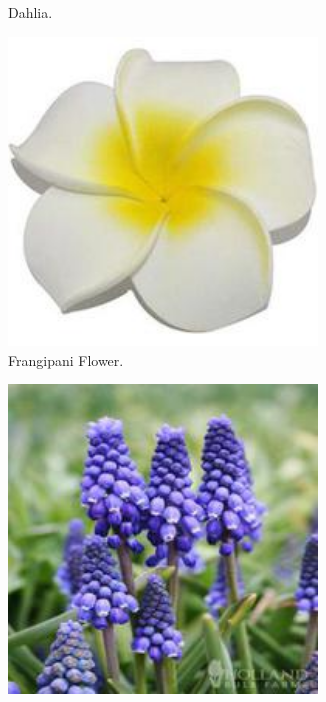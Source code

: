 \begin{figure}
\begin{subfigure}{0.24\textwidth}
        \caption{Dahlia.}
    \end{subfigure}
    \begin{subfigure}{0.24\textwidth}
        \centering
        \includegraphics[width=0.9\textwidth]{../example_images/FrangipaniFlower.jpg}
        \caption{Frangipani Flower.}
    \end{subfigure}
    \begin{subfigure}{0.24\textwidth}
        \centering
        \includegraphics[width=0.9\textwidth]{../example_images/GrapeHyacinth.jpg}

\end{subfigure}
\end{figure}
